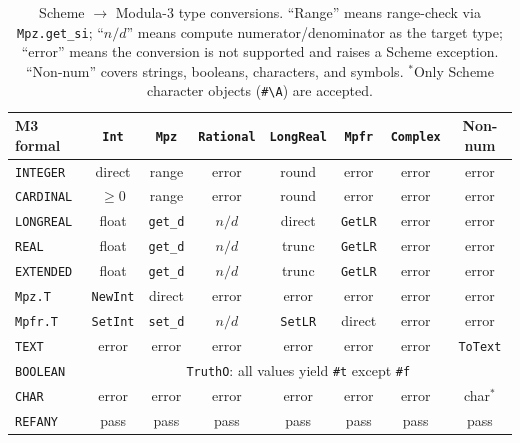 \documentclass[12pt]{article}
\begin{document}
\begin{table}[htbp]
\centering
\small
\begin{tabular}{lccccccc}
\toprule
\textbf{M3 formal} & {\tt Int} & {\tt Mpz} &
  {\tt Rational} & {\tt LongReal} & {\tt Mpfr} & {\tt Complex} & \textbf{Non-num} \\
\midrule
{\tt INTEGER}  & direct & range & error & round & error & error & error \\
{\tt CARDINAL} & $\geq 0$ & range & error & round & error & error & error \\
{\tt LONGREAL} & float & {\tt get\_d} & $n/d$ & direct & {\tt GetLR} & error & error \\
{\tt REAL}     & float & {\tt get\_d} & $n/d$ & trunc & {\tt GetLR} & error & error \\
{\tt EXTENDED} & float & {\tt get\_d} & $n/d$ & trunc & {\tt GetLR} & error & error \\
{\tt Mpz.T}    & {\tt NewInt} & direct & error & error & error & error & error \\
{\tt Mpfr.T}   & {\tt SetInt} & {\tt set\_d} & $n/d$ & {\tt SetLR} & direct & error & error \\
{\tt TEXT}     & error & error & error & error & error & error & {\tt ToText} \\
{\tt BOOLEAN}  & \multicolumn{7}{c}{{\tt TruthO}: all values yield {\tt \#t} except {\tt \#f}} \\
{\tt CHAR}     & error & error & error & error & error & error & char$^*$ \\
{\tt REFANY}   & pass & pass & pass & pass & pass & pass & pass \\
\bottomrule
\end{tabular}
\caption{Scheme $\to$ Modula-3 type conversions.
  ``Range'' means range-check via {\tt Mpz.get\_si};
  ``$n/d$'' means compute numerator/denominator as the target type;
  ``error'' means the conversion is not supported and raises a
  Scheme exception.
  ``Non-num'' covers strings, booleans, characters, and symbols.
  $^*$Only Scheme character objects ({\tt \#\textbackslash A}) are accepted.}
\label{tab:to-modula}
\end{table}
\end{document}

